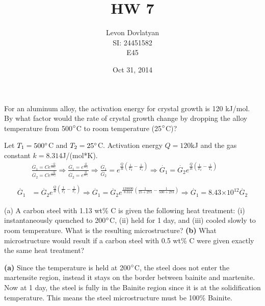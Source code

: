 \documentclass[12pt]{article}
\newenvironment{problem}[2][Problem]{\begin{trivlist}
\item[\hskip \labelsep {\bfseries #1}\hskip \labelsep {\bfseries #2.}]}{\end{trivlist}}
\begin{document}
\providecommand{\e}[1]{\ensuremath{\times 10^{#1}}}
\providecommand{\ex}[1]{\ensuremath{10^{#1}}}
 
\title{HW 7}
\author{Levon Dovlatyan \\ SI: 24451582\\ E45} 
\date{Oct 31, 2014}
\maketitle
 
\begin{problem}{10.1} 
For an aluminum alloy, the activation energy for crystal growth is 120 kJ/mol.  By what factor would the rate of crystal growth change by dropping the alloy temperature from 500$\degree$C to room temperature (25$\degree$C)?
\end{problem}
Let $T_1 = 500\degree$C and $T_2 = 25\degree$C. Activation energy $Q = 120$kJ and the gas constant $k = 8.314$J/(mol*K).
\begin{align*}
&\frac{\dot{G_1} = Ce^{\frac{-Q}{RT_1}}}{\dot{G_2} = Ce^{\frac{-Q}{RT_2}}} \Rightarrow \frac{\dot{G_1} = e^{\frac{Q}{kT_2}}}{\dot{G_2} = e^{\frac{Q}{kT_1}}} \Rightarrow \frac{\dot{G_1}}{\dot{G_2}} = e^{\frac{Q}{R}(\frac{1}{T_2}-\frac{1}{T_1})} \Rightarrow \dot{G_1} = \dot{G_2}e^{\frac{Q}{R}(\frac{1}{T_2}-\frac{1}{T_1})}  \\\\  \dot{G_1} &= \dot{G_2}e^{\frac{Q}{R}(\frac{1}{T_2}-\frac{1}{T_1})} \Rightarrow \dot{G_1} = \dot{G_2}e^{\frac{120000}{8.314}(\frac{1}{25+273}-\frac{1}{500+273})} \Rightarrow \dot{G_1} = 8.43\e{12}\dot{G_2}
\end{align*}

\begin{problem}{10.11}
(a)  A carbon steel with 1.13 wt\% C is given the following heat treatment: (i) instantaneously quenched to 200$\degree$C, (ii) held for 1 day, and (iii) cooled slowly to room temperature.  What is the resulting microstructure? \textbf{(b)} What microstructure would result if a carbon steel with 0.5 wt\% C were given exactly the same heat treatment?
\end{problem}

\textbf{(a)} Since the temperature is held at 200$\degree$C, the steel does not enter the martensite region, instead it stays on the border between bainite and martenite. Now at 1 day, the steel is fully in the Bainite region since it is at the solidification temperature. This means the steel microstructure must be 100\% Bainite.
\end{document}
